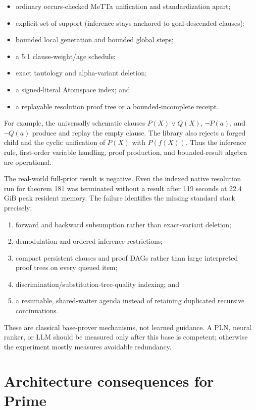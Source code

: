 \documentclass[10pt]{article}
\begin{document}
\begin{itemize}
\item ordinary occurs-checked MeTTa unification and standardization apart;
\item explicit set of support (inference stays anchored to goal-descended
  clauses);
\item bounded local generation and bounded global steps;
\item a 5:1 clause-weight/age schedule;
\item exact tautology and alpha-variant deletion;
\item a signed-literal Atomspace index; and
\item a replayable resolution proof tree or a bounded-incomplete receipt.
\end{itemize}

For example, the universally schematic clauses
$P(X)\lor Q(X)$, $\neg P(a)$, and $\neg Q(a)$ produce and replay the empty
clause.  The library also rejects a forged child and the cyclic unification of
$P(X)$ with $P(f(X))$.  Thus the inference rule, first-order variable handling,
proof production, and bounded-result algebra are operational.

The real-world full-prior result is negative.  Even the indexed native
resolution run for theorem 181 was terminated without a result after 119
seconds at 22.4 GiB peak resident memory.  The failure identifies the missing
standard stack precisely:

\begin{enumerate}
\item forward and backward subsumption rather than exact-variant deletion;
\item demodulation and ordered inference restrictions;
\item compact persistent clauses and proof DAGs rather than large interpreted
  proof trees on every queued item;
\item discrimination/substitution-tree-quality indexing; and
\item a resumable, shared-waiter agenda instead of retaining duplicated
  recursive continuations.
\end{enumerate}

These are classical base-prover mechanisms, not learned guidance.  A PLN,
neural ranker, or LLM should be measured only after this base is competent;
otherwise the experiment mostly measures avoidable redundancy.

\section{Architecture consequences for Prime}
\end{document}
